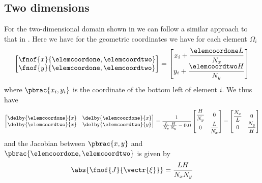 \subsection{Two dimensions}
\label{subsec:ElementStiffnessMatrixGenLaplace2D}

For the two-dimensional domain shown in
 we can follow a similar approach to that in
. Here we have for the geometric
coordinates we have for each element $\Omega_{i}$
\begin{equation}
  \begin{bmatrix}
    \fnof{x}{\elemcoordone,\elemcoordtwo} \\
    \fnof{y}{\elemcoordone,\elemcoordtwo}
  \end{bmatrix}= \begin{bmatrix}
    x_{i}+\dfrac{\elemcoordone L}{N_{x}} \\
    y_{i}+\dfrac{\elemcoordtwo H}{N_{y}}  
  \end{bmatrix}
\end{equation}
where $\pbrac{x_{i},y_{i}}$ is the coordinate of the bottom left of element $i$. We thus have 
\begin{equation}
  \begin{bmatrix}
    \delby{\elemcoordone}{x} & \delby{\elemcoordone}{x} \\
    \delby{\elemcoordtwo}{x} & \delby{\elemcoordtwo}{y}         
  \end{bmatrix} = \dfrac{1}{\frac{L}{N_{x}}\frac{H}{N_{y}}-0.0} \begin{bmatrix}
    \dfrac{H}{N_{y}} & 0 \\
    0 & \dfrac{L}{N_{x}}
  \end{bmatrix} = \begin{bmatrix}
    \dfrac{N_{x}}{L} & 0 \\
    0 & \dfrac{N_{y}}{H}
  \end{bmatrix}
\end{equation}
and the Jacobian between $\pbrac{x,y}$ and $\pbrac{\elemcoordone,\elemcoordtwo}$ is given by
\begin{equation}
  \abs{\fnof{J}{\vectr{\xi}}}=\dfrac{LH}{N_{x}N_{y}}
\end{equation}

